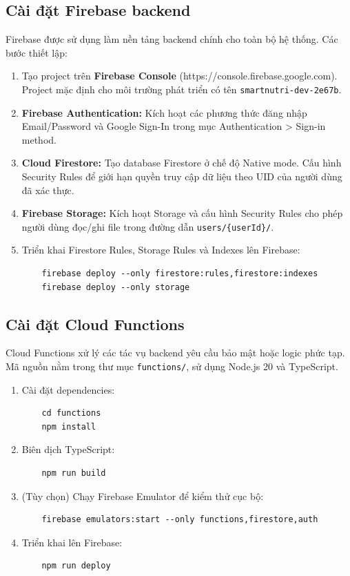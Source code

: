 \subsection{Cài đặt Firebase backend}

Firebase được sử dụng làm nền tảng backend chính cho toàn bộ hệ thống. Các bước thiết lập:

\begin{enumerate}
    \item Tạo project trên \textbf{Firebase Console} (https://console.firebase.google.com). Project mặc định cho môi trường phát triển có tên \texttt{smartnutri-dev-2e67b}.
    \item \textbf{Firebase Authentication:} Kích hoạt các phương thức đăng nhập Email/Password và Google Sign-In trong mục Authentication > Sign-in method.
    \item \textbf{Cloud Firestore:} Tạo database Firestore ở chế độ Native mode. Cấu hình Security Rules để giới hạn quyền truy cập dữ liệu theo UID của người dùng đã xác thực.
    \item \textbf{Firebase Storage:} Kích hoạt Storage và cấu hình Security Rules cho phép người dùng đọc/ghi file trong đường dẫn \texttt{users/\{userId\}/}.
    \item Triển khai Firestore Rules, Storage Rules và Indexes lên Firebase:
    \begin{verbatim}
    firebase deploy --only firestore:rules,firestore:indexes
    firebase deploy --only storage
    \end{verbatim}
\end{enumerate}

\subsection{Cài đặt Cloud Functions}

Cloud Functions xử lý các tác vụ backend yêu cầu bảo mật hoặc logic phức tạp. Mã nguồn nằm trong thư mục \texttt{functions/}, sử dụng Node.js 20 và TypeScript.

\begin{enumerate}
    \item Cài đặt dependencies:
    \begin{verbatim}
    cd functions
    npm install
    \end{verbatim}
    \item Biên dịch TypeScript:
    \begin{verbatim}
    npm run build
    \end{verbatim}
    \item (Tùy chọn) Chạy Firebase Emulator để kiểm thử cục bộ:
    \begin{verbatim}
    firebase emulators:start --only functions,firestore,auth
    \end{verbatim}
    \item Triển khai lên Firebase:
    \begin{verbatim}
    npm run deploy
    \end{verbatim}
\end{enumerate}

